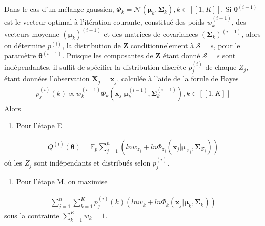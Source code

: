 \documentclass[letterpaper,10pt,french]{sphinxmanual}
\begin{document}
\sphinxAtStartPar
Dans le cas d’un mélange gaussien, \(\Phi_k=\mathcal N(\boldsymbol\mu_k,\boldsymbol\Sigma_k),k\in[\![1,K]\!]\). Si \(\boldsymbol\theta^{(i-1)}\) est le vecteur optimal à l’itération courante, constitué des poids \(w_k^{(i-1)}\), des vecteurs moyenne \((\boldsymbol\mu_k)^{(i-1)}\) et des matrices de covariances \((\boldsymbol\Sigma_k)^{(i-1)}\), alors on détermine \(p^{(i)}\), la distribution de \(\mathbf Z\) conditionnelement à \(\mathcal S=s\), pour le paramètre \(\boldsymbol\theta^{(i-1)}\). Puisque les composantes de \(\mathbf Z\) étant donné \(\mathcal S=s\) sont indépendantes, il suffit de spécifier la distribution discrète \(p_j^{(i)}\) de chaque \(Z_j\), étant données l’observation \(\mathbf X_j=\mathbf x_j\), calculée à l’aide de la forule de Bayes
\begin{equation*}
\begin{split}p_j^{(i)}(k)\propto w_k^{(i-1)}\Phi_k(\mathbf x_j|\boldsymbol\mu_k^{(i-1)},\boldsymbol\Sigma_k^{(i-1)}),k\in[\![1,K]\!]\end{split}
\end{equation*}
\sphinxAtStartPar
Alors
\begin{enumerate}
%
\item {} 
\sphinxAtStartPar
Pour l’étape E

\end{enumerate}
\begin{equation*}
\begin{split}Q^{(i)}(\boldsymbol\theta) = \mathbb{E}_p \displaystyle\sum_{j=1}^n \left (ln w_{z_j} + ln \Phi_{z_j}(\mathbf x_j|\boldsymbol\mu_{Z_j},\boldsymbol\Sigma_{Z_j}) \right )\end{split}
\end{equation*}
\sphinxAtStartPar
où les \(Z_j\) sont indépendants et distribués selon \(p_j^{(i)}\).
\begin{enumerate}
%
\item {} 
\sphinxAtStartPar
Pour l’étape M, on maximise

\end{enumerate}
\begin{equation*}
\begin{split} \displaystyle\sum_{j=1}^n\displaystyle\sum_{k=1}^K p_j^{(i)}(k)\left (ln w_k + ln \Phi_k(\mathbf x_j|\boldsymbol\mu_{k},\boldsymbol\Sigma_{k})\right )\end{split}
\end{equation*}
\sphinxAtStartPar
sous la contrainte \(\displaystyle\sum_{k=1}^K w_k=1\).
\end{document}
